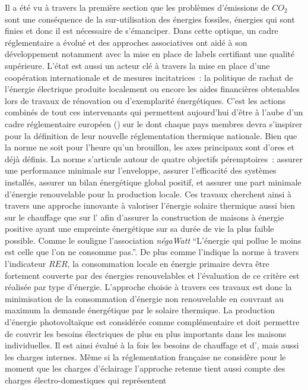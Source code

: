 Il a été vu à travers la première section que les problèmes d’émissions de $CO_{2}$
sont une conséquence de la sur-utilisation des énergies fossiles, énergies qui sont
finies et donc il est nécessaire de s’émanciper. Dans cette optique, un cadre réglementaire
a évolué et des approches associatives ont aidé à son développement notamment avec
la mise en place de labels certifiant une qualité supérieure. L’état est aussi un acteur
clé à travers la mise en place d’une coopération internationale et de mesures incitatrices~: la politique
de rachat de l’énergie électrique produite localement ou encore les aides financières
obtenables lors de travaux de rénovation ou d’exemplarité énergétiques. C’est les
actions combinés de tout ces intervenants qui permettent aujourd’hui d’être à l’aube
d’un cadre réglementaire européen () sur le  dont chaque pays membres devra s’inspirer
pour la définition de leur nouvelle réglementation thermique nationale.
Bien que la norme ne soit pour l’heure qu’un brouillon, les axes principaux sont
d’ores et déjà définis. La norme s’articule autour de quatre objectifs péremptoires~:
assurer une performance minimale sur l’enveloppe, assurer l’efficacité des systèmes
installés, assurer un bilan énergétique global positif, et assurer une part minimale
d’énergie renouvelable pour la production locale.
Ces travaux cherchent ainsi à travers une approche innovante à valoriser l’énergie
solaire thermique aussi bien sur le chauffage que sur l’ afin d’assurer
la construction de maisons à énergie positive ayant une empreinte énergétique sur
sa durée de vie la plus faible possible. Comme le souligne l’association \textit{négaWatt}
\enquote{L’énergie qui pollue le moins est celle que l’on ne consomme pas.}.
De plus comme l’indique la norme  à travers l’indicateur $RER$,
la consommation locale en énergie primaire devra être fortement couverte
par des énergies renouvelables et l’évaluation de ce critère est réalisée par type d’énergie.
L’approche choisie à travers ces travaux est donc la minimisation de la consommation
d’énergie non renouvelable en couvrant au maximum la demande énergétique par le solaire
thermique. La production d’énergie photovoltaïque
est considérée comme complémentaire et doit permettre de couvrir les besoins électriques
de plus en plus importants dans les maisons individuelles.
Il est ainsi évalué à la fois les besoins de chauffage et d’, mais aussi les charges internes.
Même si la réglementation française ne considère pour le moment que les charges d’éclairage
l’approche retenue tient aussi compte des charges électro-domestiques qui représentent
